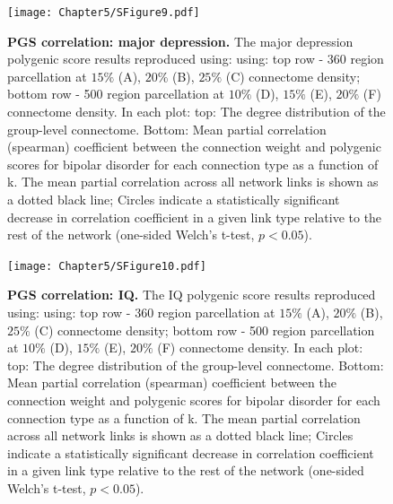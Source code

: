 \begin{figure}[h!]
\begin{center}
\texttt{[image: Chapter5/SFigure9.pdf]}%
\end{center}
\caption{\textbf{PGS correlation: major depression.} 
The major depression polygenic score results reproduced using: using: top row - 360 region parcellation at $15\%$ (A), $20\%$ (B), $25\%$ (C) connectome density; bottom row - 500 region parcellation at $10\%$ (D), $15\%$ (E), $20\%$ (F) connectome density. In each plot: top: The degree distribution of the group-level connectome. Bottom: Mean partial correlation (spearman) coefficient between the connection weight and polygenic scores for bipolar disorder for each connection type as a function of k. The mean partial correlation across all network links is shown as a dotted black line; Circles indicate a statistically significant decrease in correlation coefficient in a given link type relative to the rest of the network (one-sided Welch's t-test, $p < 0.05$).}
\label{fig:Ch5SFig9}
\end{figure}

\begin{figure}[h!]
\begin{center}
\texttt{[image: Chapter5/SFigure10.pdf]}%
\end{center}
\caption{\textbf{PGS correlation: IQ.} 
The IQ polygenic score results reproduced using: using: top row - 360 region parcellation at $15\%$ (A), $20\%$ (B), $25\%$ (C) connectome density; bottom row - 500 region parcellation at $10\%$ (D), $15\%$ (E), $20\%$ (F) connectome density. In each plot: top: The degree distribution of the group-level connectome. Bottom: Mean partial correlation (spearman) coefficient between the connection weight and polygenic scores for bipolar disorder for each connection type as a function of k. The mean partial correlation across all network links is shown as a dotted black line; Circles indicate a statistically significant decrease in correlation coefficient in a given link type relative to the rest of the network (one-sided Welch's t-test, $p < 0.05$).}
\label{fig:Ch5SFig10}
\end{figure}

